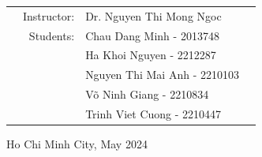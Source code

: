 \documentclass[a4paper]{report}
\begin{document}
\begin{titlepage}
  \begin{table}[h]
    \begin{tabular}{rrll}

      \hspace{5 cm}
       & Instructor: & Dr. Nguyen Thi Mong Ngoc     \\
       & Students:   & Chau Dang Minh - 2013748     \\
       &             & Ha Khoi Nguyen - 2212287     \\
       &             & Nguyen Thi Mai Anh - 2210103 \\
       &             & Võ Ninh Giang      - 2210834 \\
       &             & Trinh Viet Cuong   - 2210447
    \end{tabular}
  \end{table}
  \vspace{2cm}
  \begin{center}
    {\footnotesize Ho Chi Minh City, May 2024}
  \end{center}
\end{titlepage}



\tableofcontents








\printindex
\end{document}
